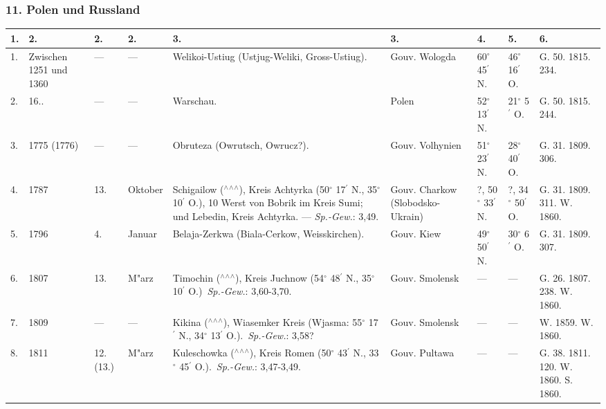 \documentclass[a4paper, 8pt, oneside, polutonikogreek, german]{article}
\begin{document}
\subsubsection{11. Polen und Russland}
\begin{center}
    \footnotesize
    \begin{longtable}{|p{3mm}|p{10mm}|p{5mm}|p{13mm}|p{25mm}|p{13mm}|p{10mm}|p{10mm}|p{11mm}|}
    \hline
        1. & 2. & 2. & 2. & 3. & 3. & 4. & 5. & 6. \\ \hline
        1. & Zwischen 1251 und 1360 & --- & --- & Welikoi-Ustiug (Ustjug-Weliki, Gross-Ustiug). & Gouv. Wologda & 60$^\circ$ 45$^\prime$ N. & 46$^\circ$ 16$^\prime$ O. & G. 50. 1815. 234. \\ \hline
        2. & 16.. & --- & --- & Warschau. & Polen & 52$^\circ$ 13$^\prime$ N. & 21$^\circ$ 5$^\prime$ O. & G. 50. 1815. 244. \\ \hline
        3. & 1775 (1776) & --- & --- & Obruteza (Owrutsch, Owrucz?). & Gouv. Volhynien & 51$^\circ$ 23$^\prime$ N. & 28$^\circ$ 40$^\prime$ O. & G. 31. 1809. 306. \\ \hline
        4. & 1787 & 13. & Oktober & Schigailow ($^\wedge$$^\wedge$$^\wedge$), Kreis Achtyrka (50$^\circ$ 17$^\prime$ N., 35$^\circ$ 10$^\prime$ O.), 10 Werst von Bobrik im Kreis Sumi; und Lebedin, Kreis Achtyrka. --- \emph{Sp.-Gew.}: 3,49. & Gouv. Charkow (Slobodsko-Ukrain) & ?, 50$^\circ$ 33$^\prime$ N. & ?, 34$^\circ$ 50$^\prime$ O. & G. 31. 1809. 311. W. 1860. \\ \hline
        5. & 1796 & 4. & Januar & Belaja-Zerkwa (Biala-Cerkow, Weisskirchen). & Gouv. Kiew & 49$^\circ$ 50$^\prime$ N. & 30$^\circ$ 6$^\prime$ O. & G. 31. 1809. 307. \\ \hline
        6. & 1807 & 13. & M"arz & Timochin ($^\wedge$$^\wedge$$^\wedge$), Kreis Juchnow (54$^\circ$ 48$^\prime$ N., 35$^\circ$ 10$^\prime$ O.) \emph{Sp.-Gew.}: 3,60-3,70. & Gouv. Smolensk & --- & --- & G. 26. 1807. 238. W. 1860. \\ \hline
        7. & 1809 & --- & --- & Kikina ($^\wedge$$^\wedge$$^\wedge$), Wiasemker Kreis (Wjasma: 55$^\circ$ 17$^\prime$ N., 34$^\circ$ 13$^\prime$ O.). \emph{Sp.-Gew.}: 3,58? & Gouv. Smolensk & --- & --- & W. 1859. W. 1860. \\ \hline
        8. & 1811 & 12. (13.) & M"arz & Kuleschowka ($^\wedge$$^\wedge$$^\wedge$), Kreis Romen (50$^\circ$ 43$^\prime$ N., 33$^\circ$ 45$^\prime$ O.). \emph{Sp.-Gew.}: 3,47-3,49. & Gouv. Pultawa & --- & --- & G. 38. 1811. 120. W. 1860. S. 1860. \\ \hline

\end{longtable}
\end{center}
\end{document}
